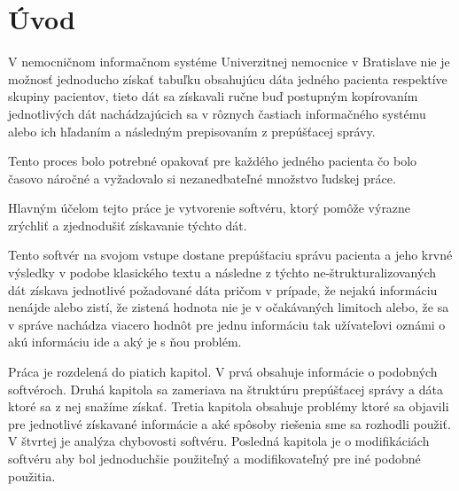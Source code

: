 \chapter*{Úvod} %

V nemocničnom informačnom systéme Univerzitnej nemocnice v Bratislave nie je možnosť jednoducho získať tabuľku obsahujúcu dáta jedného pacienta respektíve skupiny pacientov, tieto dát sa získavali ručne buď postupným kopírovaním jednotlivých dát nachádzajúcich sa v rôznych častiach informačného systému alebo ich hľadaním a následným prepisovaním z prepúšťacej správy.

Tento proces bolo potrebné opakovať pre každého jedného pacienta čo bolo časovo náročné a vyžadovalo si nezanedbateľné množstvo ľudskej práce.

Hlavným účelom tejto práce je vytvorenie softvéru, ktorý pomôže výrazne zrýchliť a zjednodušiť získavanie týchto dát.

Tento softvér na svojom vstupe dostane prepúšťaciu správu pacienta a jeho krvné výsledky v podobe klasického textu a následne z týchto ne-štrukturalizovaných dát získava jednotlivé požadované dáta pričom v prípade, že nejakú informáciu nenájde alebo zistí, že zistená hodnota nie je v očakávaných limitoch alebo, že sa v správe nachádza viacero hodnôt pre jednu informáciu tak užívateľovi oznámi o akú informáciu ide a aký je s ňou problém. 

Práca je rozdelená do piatich kapitol. V prvá obsahuje informácie o podobných softvéroch. Druhá kapitola sa zameriava na štruktúru prepúšťacej správy a dáta ktoré sa z nej snažíme získať. Tretia kapitola obsahuje problémy ktoré sa objavili pre jednotlivé získavané informácie a aké spôsoby riešenia sme sa rozhodli použiť. V štvrtej je analýza chybovosti softvéru. Posledná kapitola je o modifikáciách softvéru aby bol jednoduchšie použiteľný a modifikovateľný pre iné podobné použitia. 



